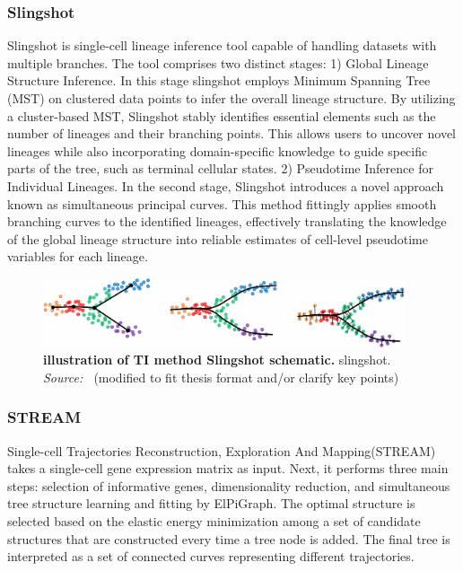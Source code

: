 \subsubsection{Slingshot}
Slingshot is single-cell lineage inference tool capable of handling datasets with multiple branches\citep{street2018slingshot}. The tool comprises two distinct stages: 1) Global Lineage Structure Inference. In this stage slingshot employs Minimum Spanning Tree (MST) on clustered data points to infer the overall lineage structure. By utilizing a cluster-based MST, Slingshot stably identifies essential elements such as the number of lineages and their branching points. This allows users to uncover novel lineages while also incorporating domain-specific knowledge to guide specific parts of the tree, such as terminal cellular states. 2) Pseudotime Inference for Individual Lineages. In the second stage, Slingshot introduces a novel approach known as simultaneous principal curves. This method fittingly applies smooth branching curves to the identified lineages, effectively translating the knowledge of the global lineage structure into reliable estimates of cell-level pseudotime variables for each lineage.
\begin{figure}[ht!]
	\centering
	\includegraphics[width=0.95\textwidth]{TI_Alg_slingshot/fig}
	\vspace{0.1cm}
	\caption[Illustration of TI method Slingshot schematic.]{\textbf{illustration of TI method Slingshot schematic.}
	slingshot. \emph{Source: ~\cite{street2018slingshot}}(modified to fit thesis format and/or clarify key points)
	}
	\label{fig:TI_Alg_slingshot}
\end{figure}


\subsubsection{STREAM}
Single-cell Trajectories Reconstruction, Exploration And Mapping(STREAM) takes a single-cell gene expression matrix as input\citep{chen2019stream}. Next, it performs three main steps: selection of informative genes, dimensionality reduction, and simultaneous tree structure learning and fitting by ElPiGraph. The optimal structure is selected based on the elastic energy minimization among a set of candidate structures that are constructed every time a tree node is added. The final tree is interpreted as a set of connected curves representing different trajectories. 


